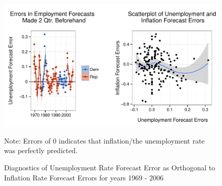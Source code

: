 \documentclass[a4paper]{article}\usepackage{graphicx, color}
\newenvironment{knitrout}{}{} %
\begin{document}
\begin{figure}[t]
    \caption{Diagnostics of Unemployment Rate Forecast Error as Orthogonal to Inflation Rate Forecast Errors for years 1969 - 2006}
    \label{Unemployment}
    \begin{center}
    
\begin{knitrout}
\color{fgcolor}

{\centering \includegraphics[width=0.95\linewidth]{figure/GraphPartisanErrorUnemploy} 

}



\end{knitrout}


    \end{center}
    \begin{singlespace}
        {\scriptsize{Note: Errors of 0 indicates that inflation/the unemployment rate was perfectly predicted.}}
    \end{singlespace}
\end{figure}



\clearpage



\end{document}
